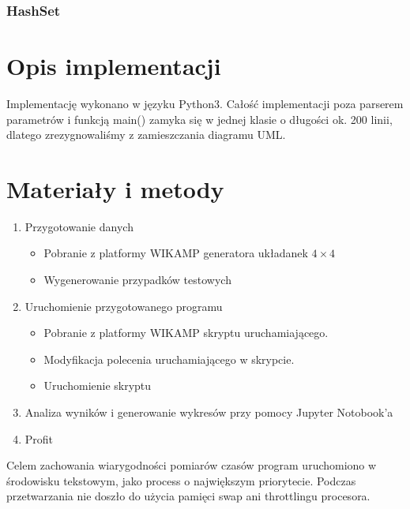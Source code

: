 \documentclass{classrep}
\begin{document}
\subsubsection{HashSet}
\section{Opis implementacji}
Implementację wykonano w języku Python3. 
Całość implementacji poza parserem parametrów i funkcją main() zamyka się w jednej klasie o długości ok. 200 linii, dlatego zrezygnowaliśmy z zamieszczania diagramu UML.

\section{Materiały i metody}

\begin{enumerate}
    \item  Przygotowanie danych
        \begin{itemize}
            \item Pobranie z platformy WIKAMP generatora układanek $4\times 4$
            \item Wygenerowanie przypadków testowych
        \end{itemize}
    \item Uruchomienie przygotowanego programu
        \begin{itemize}
            \item Pobranie z platformy WIKAMP skryptu uruchamiającego.
            \item Modyfikacja polecenia uruchamiającego w skrypcie.
            \item Uruchomienie skryptu
        \end{itemize}
    \item Analiza wyników i generowanie wykresów przy pomocy Jupyter Notobook'a
    \item Profit
\end{enumerate}

Celem zachowania wiarygodności pomiarów czasów program uruchomiono w środowisku tekstowym, jako process o największym priorytecie.
Podczas przetwarzania nie doszło do użycia pamięci swap ani throttlingu procesora.
\end{document}
